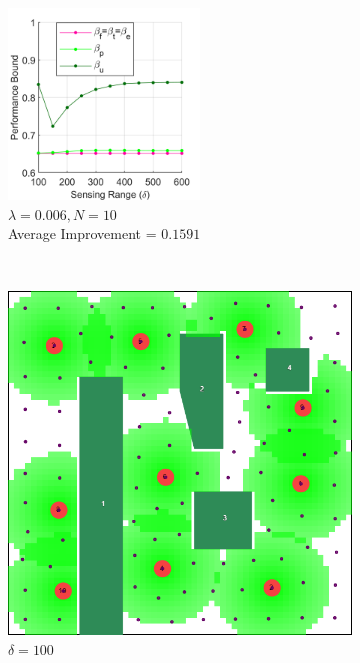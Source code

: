 \documentclass[conference]{IEEEtran}
\begin{document}
\begin{figure}[!b]
    \centering
    \begin{subfigure}[t]{\columnwidth}
        \centering
        \includegraphics[width=2in]{Figures/Gen1.png}
        \caption{$\lambda=0.006, N=10$ \\ Average Improvement = $0.1591$}
    \end{subfigure}%
    \\
    \centering
    \begin{subfigure}[t]{0.105\textwidth}
        \centering
        \includegraphics[width=\textwidth]{Figures/Gen1_1.png}
        \caption{$\delta=100$}
    \end{subfigure}\hspace{3mm}
    \begin{subfigure}[t]{0.105\textwidth}
        \centering

\end{subfigure}
\end{figure}
\end{document}
